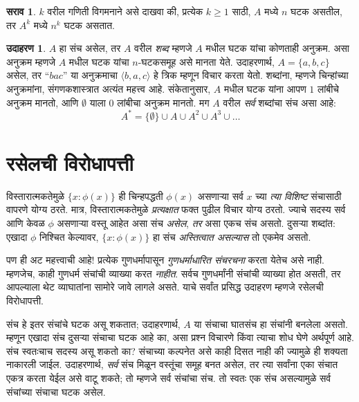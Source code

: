 \documentclass[11pt,a4paper,openany]{book}
\theoremstyle{definition}
\newtheorem{ex}[defn]{उदाहरण}
\newtheorem{prob}{सराव}[chapter]
\newcommand{\Setabs}[2]{\{#1:#2\}}
\newcommand{\tuple}[1]{\langle #1\rangle}
\begin{document}
\begin{prob}
$k$ वरील गणिती विगमनाने असे दाखवा की, प्रत्येक $k \ge 1$ साठी,
$A$ मध्ये $n$ घटक असतील, तर $A^k$ मध्ये $n^k$ घटक असतात.
\end{prob}

\begin{ex}
$A$ हा संच असेल, तर $A$ वरील \emph{शब्द} म्हणजे $A$ मधील
घटक यांचा कोणताही अनुक्रम.
असा अनुक्रम म्हणजे $A$ मधील घटक यांचा $n$-घटकसमूह असे मानता येते.
उदाहरणार्थ, $A = \{a, b, c\}$ असेल, तर ``$bac$'' या अनुक्रमाचा
$\tuple{b, a, c}$ हे त्रिक म्हणून विचार करता येतो.
शब्दांना, म्हणजे चिन्हांच्या अनुक्रमांना, संगणकशास्त्रात अत्यंत महत्त्व आहे.
संकेतानुसार, $A$ मधील घटक यांना आपण $1$ लांबीचे अनुक्रम मानतो,
आणि $\emptyset$ याला $0$ लांबीचा अनुक्रम मानतो.
मग $A$ वरील \emph{सर्व} शब्दांचा संच असा आहे:
\[
A^* = \{\emptyset\} \cup A \cup A^2 \cup A^3 \cup \dots
\]
\end{ex}












\section{रसेलची विरोधापत्ती}\label{sfr:set:rus:sec}

विस्तारात्मकतेमुळे $\Setabs{x}{\phi(x)}$ ही चिन्हपद्धती $\phi(x)$ असणाऱ्या
सर्व $x$ च्या \emph{त्या विशिष्ट} संचासाठी वापरणे योग्य ठरते.
मात्र, विस्तारात्मकतेमुळे \emph{प्रत्यक्षात} फक्त पुढील विचार योग्य ठरतो.
ज्याचे सदस्य सर्व आणि केवळ $\phi$ असणाऱ्या वस्तू आहेत असा संच \emph{असेल},
\emph{तर} असा एकच संच असतो. दुसऱ्या शब्दांत: एखादा $\phi$ निश्चित केल्यावर,
$\Setabs{x}{\phi(x)}$ हा संच \emph{अस्तित्वात असल्यास} तो एकमेव असतो.

पण ही अट महत्त्वाची आहे!{} प्रत्येक गुणधर्मापासून \emph{गुणधर्माधारित संचरचना}
करता येतेच असे नाही. म्हणजेच, काही गुणधर्म संचांची व्याख्या करत \emph{नाहीत}.
सर्वच गुणधर्मांनी संचांची व्याख्या होत असती, तर आपल्याला थेट व्याघातांना
सामोरे जावे लागले असते. याचे सर्वांत प्रसिद्ध उदाहरण म्हणजे रसेलची विरोधापत्ती.

संच हे इतर संचांचे घटक असू शकतात; उदाहरणार्थ, $A$ या संचाचा घातसंच
हा संचांनी बनलेला असतो. म्हणून एखादा संच दुसऱ्या संचाचा घटक आहे का,
असा प्रश्न विचारणे किंवा त्याचा शोध घेणे अर्थपूर्ण आहे. संच स्वतःचाच सदस्य
असू शकतो का? संचाच्या कल्पनेत असे काही दिसत नाही की ज्यामुळे ही शक्यता
नाकारली जाईल. उदाहरणार्थ, \emph{सर्व} संच मिळून वस्तूंचा समूह बनत असेल,
तर त्या सर्वांना एका संचात एकत्र करता येईल असे वाटू शकते; तो म्हणजे सर्व
संचांचा संच. तो स्वतः एक संच असल्यामुळे सर्व संचांच्या संचाचा घटक असेल.
\end{document}
